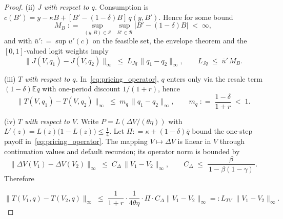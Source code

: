 \documentclass[12pt]{article}
\providecommand{\coloneqq}{\mathrel{\mathop:}=}
\providecommand{\eqqcolon}{=\mathrel{\mathop:}}
\theoremstyle{plain}
\newcommand{\E}{\mathbb{E}}
\begin{document}
\begin{proof}
	(ii) \emph{$J$ with respect to $q$.}
	Consumption is $c(B')=y-\kappa B+[B'-(1-\delta)B]\,q(y,B')$.
	Hence for some bound
	\[
		M_B \;\coloneqq\; \sup_{(y,B)\in\mathcal S}\;\sup_{B'\in\mathcal B} \bigl|B'-(1-\delta)B\bigr| \;<\;\infty,
	\]
	and with $\bar u'\coloneqq\sup u'(c)$ on the feasible set, the envelope theorem
	and the $[0,1]$-valued logit weights imply
	\begin{equation}
		\label{eq:LJq}
		\|J(V,q_1)-J(V,q_2)\|_\infty \;\le\; L_{Jq}\,\|q_1-q_2\|_\infty,
		\qquad
		L_{Jq}\;\le\;\bar u'\,M_B.
	\end{equation}

	(iii) \emph{$T$ with respect to $q$.}
	In~\eqref{eq:pricing_operator}, $q$ enters only via the resale term $(1-\delta)\E q$ with one-period discount $1/(1+r)$, hence
	\begin{equation}
		\label{eq:Tq}
		\|T(V,q_1)-T(V,q_2)\|_\infty \;\le\; m_q\,\|q_1-q_2\|_\infty,
		\qquad
		m_q \;\coloneqq\; \frac{1-\delta}{1+r}\;<\;1.
	\end{equation}

	(iv) \emph{$T$ with respect to $V$.}
	Write $P=L\!\left(\Delta V/(\theta\eta)\right)$ with $L'(z)=L(z)\bigl(1-L(z)\bigr)\le\tfrac14$.
	Let $\Pi\coloneqq \kappa+(1-\delta)\bar q$ bound the one-step payoff in~\eqref{eq:pricing_operator}.
	The mapping $V\mapsto \Delta V$ is linear in $V$ through continuation values and default recursion; its operator norm is bounded by
	\[
		\|\Delta V(V_1)-\Delta V(V_2)\|_\infty \;\le\; C_\Delta\,\|V_1-V_2\|_\infty,
		\qquad
		C_\Delta \;\le\; \frac{\beta}{\,1-\beta(1-\gamma)\,}.
	\]
	Therefore

	\begin{equation}
		\label{eq:LTV}
		\|T(V_1,q)-T(V_2,q)\|_\infty
		\;\le\;
		\frac{1}{1+r}\cdot \frac{1}{4\theta\eta}\cdot \Pi \cdot C_\Delta \|V_1-V_2\|_\infty
		\eqqcolon L_{TV}\;\|V_1-V_2\|_\infty .
	\end{equation}


\end{proof}
\end{document}
